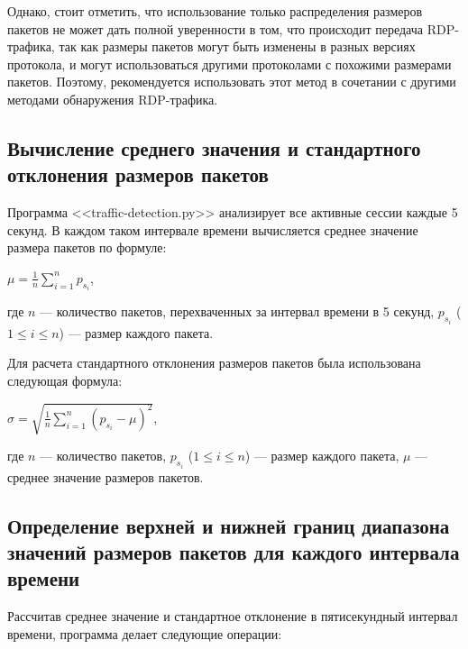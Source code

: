 \documentclass[bachelor, och, coursework]{SCWorks}
\begin{document}
Однако, стоит отметить, что использование только распределения размеров пакетов не может дать полной уверенности в том, 
что происходит передача RDP-трафика, так как размеры пакетов могут быть изменены в разных версиях протокола, и могут 
использоваться другими протоколами с похожими размерами пакетов. Поэтому, рекомендуется использовать этот метод в 
сочетании с другими методами обнаружения RDP-трафика.


\subsection{Вычисление среднего значения и стандартного отклонения размеров пакетов}

Программа <<traffic-detection.py>> анализирует все активные сессии каждые 5 секунд. В каждом таком интервале времени 
вычисляется среднее значение размера пакетов по формуле:

\begin{center}
  $\mu = \frac{1}{n}\sum_{i = 1}^{n} p_{s_i}$,
\end{center}

где $n$ --- количество пакетов, перехваченных за интервал времени в 5 секунд, $p_{s_i}$ ($1 \leq i \leq n$) --- размер каждого пакета.

Для расчета стандартного отклонения размеров пакетов была использована следующая формула:

\begin{center}
  $\sigma = \sqrt{\frac{1}{n} \sum_{i = 1}^{n} (p_{s_i} - \mu)^2}$,
\end{center}

где $n$ --- количество пакетов,  $p_{s_i}$ ($1 \leq i \leq n$) --- размер каждого пакета, 
$\mu$ --- среднее значение размеров пакетов.

\subsection{Определение верхней и нижней границ диапазона значений размеров пакетов для каждого интервала времени}

Рассчитав среднее значение и стандартное отклонение в пятисекундный интервал времени, программа делает следующие операции:
\end{document}
